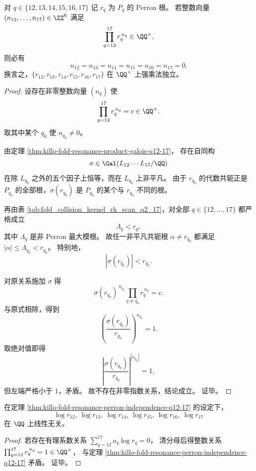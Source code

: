 \begin{theorem}\label{thm:killo-fold-resonance-perron-independence-q12-17}
对 \(q\in\{12,13,14,15,16,17\}\) 记 \(r_q\) 为 \(P_q\) 的 Perron 根。
若整数向量 \((n_{12},\dots,n_{17})\in\ZZ^6\) 满足
\[
\prod_{q=12}^{17} r_q^{\,n_q}\in\QQ^\times,
\]
则必有
\[
n_{12}=n_{13}=n_{14}=n_{15}=n_{16}=n_{17}=0.
\]
换言之，\(\{r_{12},r_{13},r_{14},r_{15},r_{16},r_{17}\}\) 在 \(\QQ^\times\) 上强乘法独立。
\end{theorem}

\begin{proof}
设存在非零整数向量 \((n_q)\) 使
\[
\prod_{q=12}^{17} r_q^{\,n_q}=c\in\QQ^\times.
\]
取其中某个 \(q_0\) 使 \(n_{q_0}\neq 0\)。

由定理 \ref{thm:killo-fold-resonance-product-galois-q12-17}，
存在自同构
\[
\sigma\in\Gal(L_{12}\cdots L_{17}/\QQ)
\]
在除 \(L_{q_0}\) 之外的五个因子上恒等，而在 \(L_{q_0}\) 上非平凡。
由于 \(r_{q_0}\) 的代数共轭正是 \(P_{q_0}\) 的全部根，\(\sigma(r_{q_0})\) 是 \(P_{q_0}\) 的某个与 \(r_{q_0}\) 不同的根。

再由表 \ref{tab:fold_collision_kernel_rh_scan_q2_17}，对全部
\(
q\in\{12,\dots,17\}
\)
都严格成立
\[
\Lambda_q<r_q,
\]
其中 \(\Lambda_q\) 是非 Perron 最大模根。
故任一非平凡共轭根 \(\alpha\neq r_{q_0}\) 都满足
\(
|\alpha|\le \Lambda_{q_0}<r_{q_0}
\)。
特别地，
\[
|\sigma(r_{q_0})|<r_{q_0}.
\]

对原关系施加 \(\sigma\) 得
\[
\sigma(r_{q_0})^{\,n_{q_0}}\prod_{q\neq q_0}r_q^{\,n_q}=c.
\]
与原式相除，得到
\[
\left(\frac{\sigma(r_{q_0})}{r_{q_0}}\right)^{n_{q_0}}=1.
\]
取绝对值即得
\[
\left|\frac{\sigma(r_{q_0})}{r_{q_0}}\right|^{|n_{q_0}|}=1,
\]
但左端严格小于 \(1\)，矛盾。
故不存在非零指数关系，结论成立。
证毕。
\end{proof}

\begin{corollary}\label{cor:killo-fold-resonance-log-linear-independence-q12-17}
在定理 \ref{thm:killo-fold-resonance-perron-independence-q12-17} 的设定下，
\[
\log r_{12},\ \log r_{13},\ \log r_{14},\ \log r_{15},\ \log r_{16},\ \log r_{17}
\]
在 \(\QQ\) 上线性无关。
\end{corollary}

\begin{proof}
若存在有理系数关系
\(
\sum_{q=12}^{17}a_q\log r_q=0
\)，
清分母后得整数关系
\(
\prod_{q=12}^{17}r_q^{\,n_q}=1\in\QQ^\times
\)，
与定理 \ref{thm:killo-fold-resonance-perron-independence-q12-17} 矛盾。
证毕。
\end{proof}
